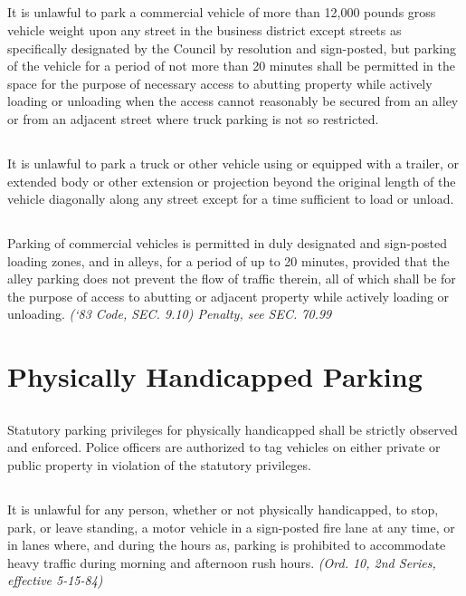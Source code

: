 \documentclass[code.tex]{subfiles}
\begin{document}
\subsection{}
It is unlawful to park a commercial vehicle of more than 12,000 pounds gross vehicle weight upon any street in the business district except streets as specifically designated by the Council by resolution and sign-posted, but parking of the vehicle for a period of not more than 20 minutes shall be permitted in the space for the purpose of necessary access to abutting property while actively loading or unloading when the access cannot reasonably be secured from an alley or from an adjacent street where truck parking is not so restricted.
\subsection{}
It is unlawful to park a truck or other vehicle using or equipped with a trailer, or extended body or other extension or projection beyond the original length of the vehicle diagonally along any street except for a time sufficient to load or unload.
\subsection{}
Parking of commercial vehicles is permitted in duly designated and sign-posted loading zones, and in alleys, for a period of up to 20 minutes, provided that the alley parking does not prevent the flow of traffic therein, all of which shall be for the purpose of access to abutting or adjacent property while actively loading or unloading.\newline
\emph{(‘83 Code, SEC. 9.10)  Penalty, see SEC. 70.99}

\section{Physically Handicapped Parking}
\subsection{}
Statutory parking privileges for physically handicapped shall be strictly observed and enforced.  Police officers are authorized to tag vehicles on either private or public property in violation of the statutory privileges.
\subsection{}
It is unlawful for any person, whether or not physically handicapped, to stop, park, or leave standing, a motor vehicle in a sign-posted fire lane at any time, or in lanes where, and during the hours as, parking is prohibited to accommodate heavy traffic during morning and afternoon rush hours. \emph{(Ord. 10, 2nd Series, effective 5-15-84)}
\end{document}
